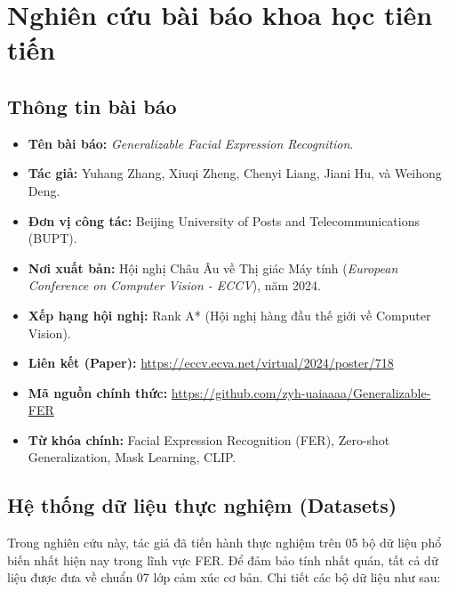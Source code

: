\section{Nghiên cứu bài báo khoa học tiên tiến}

\subsection{Thông tin bài báo}

\begin{itemize}
    \item \textbf{Tên bài báo:} \textit{Generalizable Facial Expression Recognition}.
    \item \textbf{Tác giả:} Yuhang Zhang, Xiuqi Zheng, Chenyi Liang, Jiani Hu, và Weihong Deng.
    \item \textbf{Đơn vị công tác:} Beijing University of Posts and Telecommunications (BUPT).
    \item \textbf{Nơi xuất bản:} Hội nghị Châu Âu về Thị giác Máy tính (\textit{European Conference on Computer Vision - ECCV}), năm 2024. 
    \item \textbf{Xếp hạng hội nghị:} Rank A* (Hội nghị hàng đầu thế giới về Computer Vision).
    \item \textbf{Liên kết (Paper):} \url{https://eccv.ecva.net/virtual/2024/poster/718}
    \item \textbf{Mã nguồn chính thức:} \url{https://github.com/zyh-uaiaaaa/Generalizable-FER}
    \item \textbf{Từ khóa chính:} Facial Expression Recognition (FER), Zero-shot Generalization, Mask Learning, CLIP.
\end{itemize}

\subsection{Hệ thống dữ liệu thực nghiệm (Datasets)}
Trong nghiên cứu này, tác giả đã tiến hành thực nghiệm trên 05 bộ dữ liệu phổ biến nhất hiện nay trong lĩnh vực FER. Để đảm bảo tính nhất quán, tất cả dữ liệu được đưa về chuẩn 07 lớp cảm xúc cơ bản. Chi tiết các bộ dữ liệu như sau:

